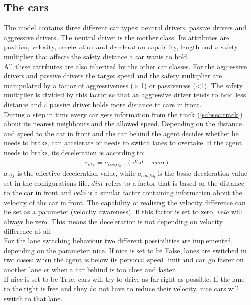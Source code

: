 \documentclass[11pt,a4paper,twocolumn]{article}
\begin{document}
\subsection{The cars} \label{subsec:cars}
The model contains three different car types: neutral drivers, passive drivers and aggressive drivers. The neutral driver is the mother class. Its attributes are position, velocity, acceleration and deceleration capability, length and a safety multiplier that affects the safety distance a car wants to hold. \\
All these attributes are also inherited by the other car classes. 
For the aggressive drivers and passive drivers the target speed and the safety multiplier are manipulated by a factor of aggressiveness (> 1) or passiveness (<1). The safety multiplier is divided by this factor so that an aggressive driver tends to hold less distance and a passive driver holds more distance to cars in front. \\
During a step in time every car gets information from the track (\ref{subsec:track}) about its nearest neighbours and the allowed speed. Depending on the distance and speed to the car in front and the car behind the agent decides whether he needs to brake, can accelerate or needs to switch lanes to overtake. If the agent needs to brake, its deceleration is according to:
\begin{align*}
a_{eff} = a_{config} \cdot (dist + velo)
\end{align*}
$a_{eff}$ is the effective deceleration value, while $a_{config}$ is the basic deceleration value set in the configurations file. $dist$ refers to a factor that is based on the distance to the car in front and $velo$ is a similar factor containing information about the velocity of the car in front. The capability of realising the velocity difference can be set as a parameter (velocity awareness). If this factor is set to zero, $velo$ will always be zero. This means the deceleration is not depending on velocity difference at all.\\
For the lane switching behaviour two different possibilities are implemented, depending on the parameter: nice. If nice is set to be False, lanes are switched in two cases: when the agent is below its personal speed limit and can go faster on another lane or when a car behind is too close and faster.\\
If nice is set to be True, cars will try to drive as far right as possible. If the lane to the right is free and they do not have to reduce their velocity, nice cars will switch to that lane. 
\end{document}
